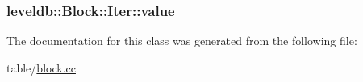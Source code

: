 \hypertarget{classleveldb_1_1_block_1_1_iter_a5af74baeadb7f39bb6fa5da621fe04e0}{
\subsubsection[{value\-\_\-}]{ leveldb\-::\-Block\-::\-Iter\-::value\-\_\-\hspace{0.3cm}{\ttfamily [private]}}}\label{classleveldb_1_1_block_1_1_iter_a5af74baeadb7f39bb6fa5da621fe04e0}


The documentation for this class was generated from the following file\-:\begin{DoxyCompactItemize}
\item 
table/\hyperlink{block_8cc}{block.\-cc}\end{DoxyCompactItemize}
